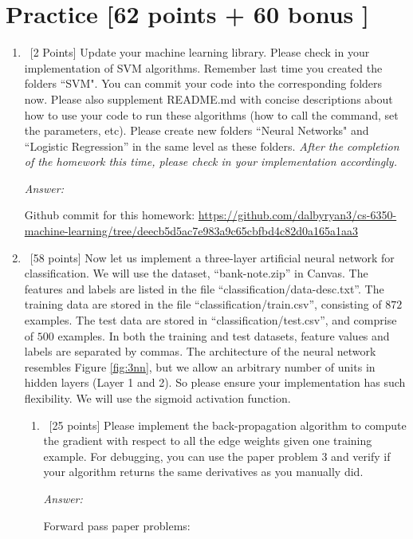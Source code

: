 \documentclass[12pt, fullpage,letterpaper]{article}
\begin{document}
\section{Practice [62 points + 60 bonus ]}
\begin{enumerate}
	\item~[2 Points] Update your machine learning library. Please check in your implementation of SVM algorithms. Remember last time you created the folders ``SVM". You can commit your code into the corresponding folders now. Please also supplement README.md with concise descriptions about how to use your code to run these algorithms (how to call the command, set the parameters, etc). Please create new folders ``Neural Networks" and ``Logistic Regression''  in the same level as these folders.  \textit{After the completion of the homework this time, please check in your implementation accordingly. }

	\textit{Answer:}

	Github commit for this homework: \url{https://github.com/dalbyryan3/cs-6350-machine-learning/tree/deecb5d5ac7e983a9c65cbfbd4c82d0a165a1aa3}


	\item~[58 points] Now let us implement a three-layer artificial neural network for classification. We will use the dataset, ``bank-note.zip'' in Canvas. The features and labels are listed in the file ``classification/data-desc.txt''. The training data are stored in the file ``classification/train.csv'', consisting of $872$ examples. The test data are stored in ``classification/test.csv'', and comprise of $500$ examples. In both the training and test datasets, feature values and labels are separated by commas.
	The architecture of the neural network resembles Figure \ref{fig:3nn}, but we allow an arbitrary number of  units in hidden layers (Layer 1  and 2). So please ensure your implementation has such flexibility. We will use the sigmoid activation function. 

\begin{enumerate}
	\item ~[25 points] Please implement the back-propagation algorithm to compute the gradient with respect to all the edge weights given one training example.  For debugging, you can use the paper problem 3 and verify if your algorithm returns the same derivatives as you manually did. 

	\textit{Answer:}

	Forward pass paper problems:


\end{enumerate}
\end{enumerate}
\end{document}
